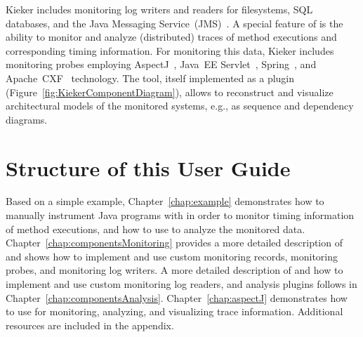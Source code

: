 Kieker includes monitoring log writers and readers for filesystems, SQL %
databases, and the Java Messaging Service~(JMS)~\cite{JMS-WebSite}. %
A special feature of \Kieker{} is the ability to monitor and analyze (distributed) %
traces of method executions and corresponding timing information. %
For monitoring this data, Kieker includes monitoring probes employing %
AspectJ~\cite{AspectJ-WebSite}, %
Java~EE Servlet~\cite{JavaServletTechnology-WebSite}, %
Spring~\cite{Spring-WebSite}, and %
Apache~CXF~\cite{CXF-WebSite} technology. %
The \KiekerTraceAnalysis{} tool, itself implemented as a \KiekerAnalysisPart{} %
plugin (Figure~\ref{fig:KiekerComponentDiagram}), allows to reconstruct and visualize architectural models of the monitored %
systems, e.g., as sequence and dependency diagrams.

\pagebreak

\section{Structure of this User Guide}

Based on a simple example, Chapter~\ref{chap:example} demonstrates %
how to manually instrument Java programs with \KiekerMonitoringPart{} %
in order to monitor timing information of method executions, and %
how to use \KiekerAnalysisPart{} to analyze the monitored data. %
Chapter~\ref{chap:componentsMonitoring} provides a more detailed %
description of \KiekerMonitoringPart{} and shows how to implement and %
use custom monitoring records, monitoring probes, and monitoring log writers. %
A more detailed description of \KiekerAnalysisPart{} and how to implement and use %
custom monitoring log readers, and analysis plugins follows in %
Chapter~\ref{chap:componentsAnalysis}. %
Chapter~\ref{chap:aspectJ} demonstrates how to use \KiekerTraceAnalysis{} %
for monitoring, analyzing, and visualizing trace information. %
Additional resources are included in the appendix.

\quad\\



